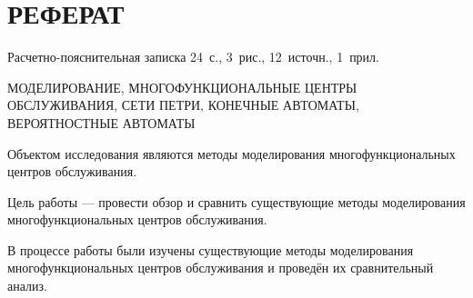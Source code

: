 \chapter*{РЕФЕРАТ}

Расчетно-пояснительная записка 24~с., 3~рис., 12~источн., 1~прил.

\noindent\MakeUppercase{моделирование, многофункциональные центры обслуживания, сети петри, конечные автоматы, вероятностные автоматы}

Объектом исследования являются методы моделирования многофункциональных центров обслуживания.

Цель работы --- провести обзор и сравнить существующие методы моделирования  многофункциональных центров обслуживания.

В процессе работы были изучены существующие методы моделирования  многофункциональных центров обслуживания и проведён их сравнительный анализ.

\setcounter{page}{3}
